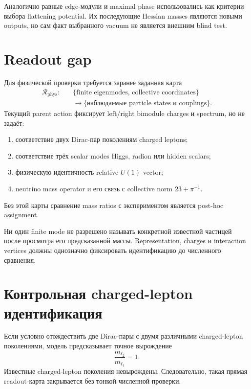 Аналогично равные edge-модули и maximal phase использовались как критерии
выбора flattening potential. Их последующие Hessian masses являются
новыми outputs, но сам факт выбранного vacuum не является внешним blind
test.

\section{Readout gap}

Для физической проверки требуется заранее заданная карта
\begin{equation}
 \begin{aligned}
 \mathcal R_{\mathrm{phys}}:\quad
 &\{\text{finite eigenmodes, collective coordinates}\}
 \\
 &\longrightarrow
 \{\text{наблюдаемые particle states и couplings}\}.
 \end{aligned}
\end{equation}
Текущий parent action фиксирует left/right bimodule charges и spectrum, но
не задаёт:
\begin{enumerate}
 \item соответствие двух Dirac-пар поколениям charged leptons;
 \item соответствие трёх scalar modes Higgs, radion или hidden scalars;
 \item физическую идентичность relative-\(U(1)\) vector;
 \item neutrino mass operator и его связь с collective norm
 \(23+\pi^{-1}\).
\end{enumerate}
Без этой карты сравнение mass ratios с экспериментом является
post-hoc assignment.

\begin{nogocriterion}
Ни один finite mode не разрешено называть конкретной известной частицей
после просмотра его предсказанной массы. Representation, charges и
interaction vertices должны однозначно фиксировать идентификацию до
численного сравнения.
\end{nogocriterion}

\section{Контрольная charged-lepton идентификация}

Если условно отождествить две Dirac-пары с двумя различными
charged-lepton поколениями, модель предсказывает точное вырождение
\begin{equation}
 \frac{m_{\ell_2}}{m_{\ell_1}}=1.
\end{equation}
Известные charged-lepton поколения невырождены. Следовательно, такая
прямая readout-карта закрывается без тонкой численной проверки.

